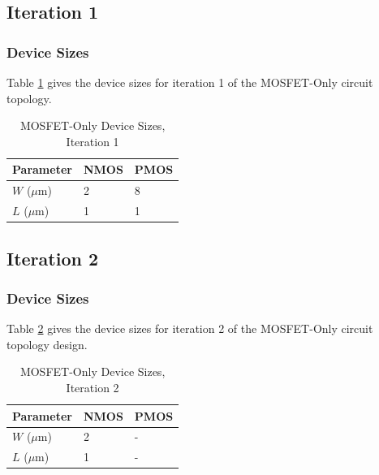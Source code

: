 \documentclass[conference]{IEEEtran}
\begin{document}
\subsection{Iteration 1}
\subsubsection{Device Sizes}
Table \ref{tab:mo-ds-1} gives the device sizes for iteration 1 of the MOSFET-Only circuit topology.
\begin{table}[!htbp]
  \caption[]{MOSFET-Only Device Sizes, Iteration 1}
  \label{tab:mo-ds-1}
  \centering
  \begin{tabular}{|l|l|l|}
    \hline
    Parameter			& NMOS	&PMOS \\ \hline
    $W$ ($\mu$m)		&2		&8\\ 
    $L$ ($\mu$m)		& 1		&1\\
    \hline
  \end{tabular}
\end{table}

\subsection{Iteration 2}
\subsubsection{Device Sizes}
Table \ref{tab:mo-ds-2} gives the device sizes for iteration 2 of the MOSFET-Only circuit topology design.
\begin{table}[!htbp]
  \caption[]{MOSFET-Only Device Sizes, Iteration 2}
  \label{tab:mo-ds-2}
  \centering
  \begin{tabular}{|l|l|l|}
    \hline
    Parameter			& NMOS	&PMOS \\ \hline
    $W$ ($\mu$m)		&2		&-\\ 
    $L$ ($\mu$m)		& 1		&-\\
    \hline
  \end{tabular}
\end{table}

\end{document}
